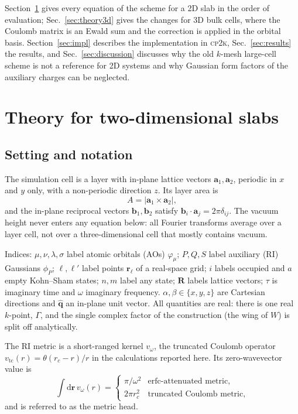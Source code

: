 \documentclass[%
 reprint,
superscriptaddress,
 amsmath,amssymb,
 aps,
prb,
]{revtex4-2}
\newcommand{\br}{\mathbf{r}}
\newcommand{\bR}{\mathbf{R}}
\newcommand{\qhat}{\hat{\mathbf{q}}}
\newcommand{\dd}{\mathrm{d}}
\newcommand{\tc}{\mathrm{tc}}
\newcommand{\cpk}{\textsc{cp2k}}
\begin{document}
Section~\ref{sec:theory2d} gives every equation of the scheme for a 2D slab in the order of
evaluation; Sec.~\ref{sec:theory3d} gives the changes for 3D bulk cells, where the Coulomb
matrix is an Ewald sum and the correction is applied in the orbital basis.
Section~\ref{sec:impl} describes the implementation in \cpk{}, Sec.~\ref{sec:results} the
results, and Sec.~\ref{sec:discussion} discusses why the old $k$-mesh large-cell scheme is not
a reference for 2D systems and why Gaussian form factors of the auxiliary charges can be
neglected.

\section{Theory for two-dimensional slabs}
\label{sec:theory2d}

\subsection{Setting and notation}
\label{sec:setting}

The simulation cell is a layer with in-plane lattice vectors $\mathbf a_1,\mathbf a_2$,
periodic in $x$ and $y$ only, with a non-periodic direction $z$. Its layer area is
\begin{equation}
  A = |\mathbf a_1\times\mathbf a_2| ,
\end{equation}
and the in-plane reciprocal vectors $\mathbf b_1,\mathbf b_2$ satisfy
$\mathbf b_i\cdot\mathbf a_j = 2\pi\delta_{ij}$. The vacuum height never enters any equation
below: all Fourier transforms average over a layer cell, not over a three-dimensional cell that
mostly contains vacuum.

Indices: $\mu,\nu,\lambda,\sigma$ label atomic orbitals (AOs) $\varphi_\mu$; $P,Q,S$ label
auxiliary (RI) Gaussians $\phi_P$; $\ell,\ell'$ label points $\br_\ell$ of a real-space grid;
$i$ labels occupied and $a$ empty Kohn--Sham states; $n,m$ label any state; $\bR$ labels lattice
vectors; $\tau$ is imaginary time and $\omega$ imaginary frequency. $\alpha,\beta\in\{x,y,z\}$
are Cartesian directions and $\qhat$ an in-plane unit vector. All quantities are real: there is
one real $k$-point, $\Gamma$, and the single complex factor of the construction (the wing of $W$)
is split off analytically.

The RI metric is a short-ranged kernel $v_\omega$, the truncated Coulomb operator
$v_\tc(r) = \theta(r_c-r)/r$ in the calculations reported here. Its zero-wavevector value is
\begin{equation}
  \int\dd\br\, v_\omega(r) =
  \begin{cases}
    \pi/\omega^2 & \text{erfc-attenuated metric},\\
    2\pi r_c^2 & \text{truncated Coulomb metric},
  \end{cases}
  \label{eq:metric_head}
\end{equation}
and is referred to as the metric head.
\end{document}
